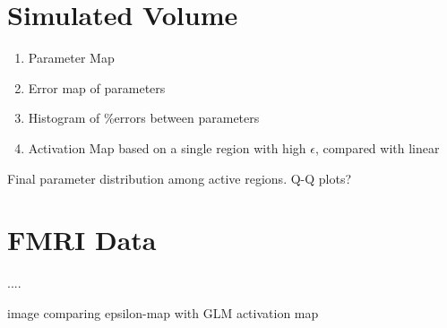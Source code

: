 \section{Simulated Volume}
\begin{enumerate}
\item Parameter Map 
\item Error map of parameters
\item Histogram of \%errors between parameters
\item Activation Map based on a single region with high $\epsilon$, compared with linear
\end{enumerate}

Final parameter distribution among active regions.
Q-Q plots?

\section{FMRI Data}
....

image comparing epsilon-map with GLM activation map

